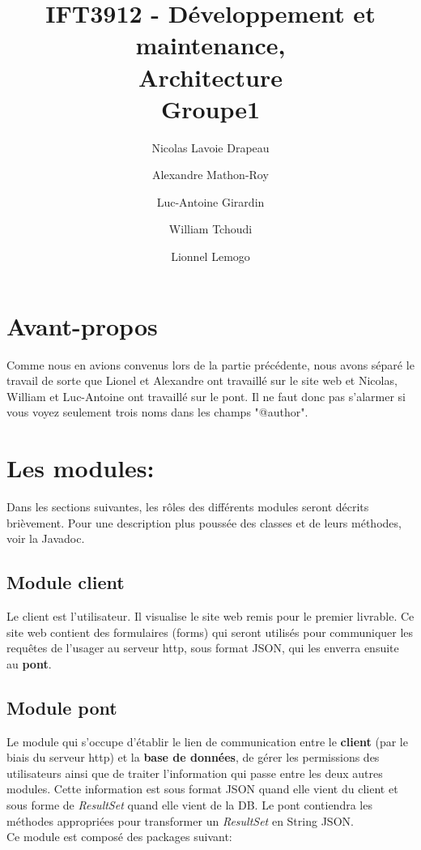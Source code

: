 \documentclass[10pt,a4paper]{report}
\author{Nicolas Lavoie Drapeau \and Alexandre Mathon-Roy \and Luc-Antoine Girardin \and William Tchoudi \and Lionnel Lemogo}
\title{IFT3912 - Développement et maintenance,\\Architecture\\Groupe1}
\begin{document}
\maketitle
\begin{flushleft}
\section*{Avant-propos}
Comme nous en avions convenus lors de la partie précédente, nous avons séparé le travail de sorte que Lionel et Alexandre ont travaillé sur le site web et Nicolas, William et Luc-Antoine ont travaillé sur le pont. Il ne faut donc pas s'alarmer si vous voyez seulement trois noms dans les champs "@author".\\
\bigskip
\section{Les modules:}
Dans les sections suivantes, les rôles des différents modules seront décrits brièvement. Pour une description plus poussée des classes et de leurs méthodes, voir la Javadoc.\\
\bigskip
\subsection{Module client}
Le client est l'utilisateur. Il visualise le site web remis pour le premier livrable. Ce site web contient des formulaires (forms) qui seront utilisés pour communiquer les requêtes de l'usager au serveur http, sous format JSON, qui les enverra ensuite au \textbf{pont}.\\
\bigskip
\subsection{Module pont}
Le module qui s'occupe d'établir le lien de communication entre le \textbf{client} (par le biais du serveur http) et la \textbf{base de données}, de gérer les permissions des utilisateurs ainsi que de traiter l'information qui passe entre les deux autres modules. Cette information est sous format JSON quand elle vient du client et sous forme de \emph{ResultSet} quand elle vient de la DB. Le pont contiendra les méthodes appropriées pour transformer un \emph{ResultSet} en String JSON.\\
\medskip
Ce module est composé des packages suivant:\\
\bigskip

\end{flushleft}
\end{document}
